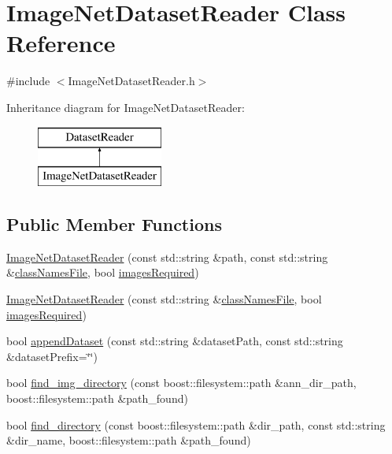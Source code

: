\hypertarget{class_image_net_dataset_reader}{}\section{Image\+Net\+Dataset\+Reader Class Reference}
\label{class_image_net_dataset_reader}


{\ttfamily \#include $<$Image\+Net\+Dataset\+Reader.\+h$>$}

Inheritance diagram for Image\+Net\+Dataset\+Reader\+:\begin{figure}[H]
\begin{center}
\leavevmode
\includegraphics[height=2.000000cm]{class_image_net_dataset_reader}
\end{center}
\end{figure}
\subsection*{Public Member Functions}
\begin{DoxyCompactItemize}
\item 
\hyperlink{class_image_net_dataset_reader_aca1e379e9959ec441fc9f3cf51ae5af1}{Image\+Net\+Dataset\+Reader} (const std\+::string \&path, const std\+::string \&\hyperlink{class_dataset_reader_a45ded43b56539f1e37a24ca9c94b4611}{class\+Names\+File}, bool \hyperlink{class_dataset_reader_a71d04d25d58e0e9a0c05d69afcff03a1}{images\+Required})
\item 
\hyperlink{class_image_net_dataset_reader_a451f7a4c7a11966e2539a0a51d7cd089}{Image\+Net\+Dataset\+Reader} (const std\+::string \&\hyperlink{class_dataset_reader_a45ded43b56539f1e37a24ca9c94b4611}{class\+Names\+File}, bool \hyperlink{class_dataset_reader_a71d04d25d58e0e9a0c05d69afcff03a1}{images\+Required})
\item 
bool \hyperlink{class_image_net_dataset_reader_ae9aa640c47637de8cf22ed3644c945c6}{append\+Dataset} (const std\+::string \&dataset\+Path, const std\+::string \&dataset\+Prefix=\char`\"{}\char`\"{})
\item 
bool \hyperlink{class_image_net_dataset_reader_ac9bbb0c47493ea984681d51be2e04b45}{find\+\_\+img\+\_\+directory} (const boost\+::filesystem\+::path \&ann\+\_\+dir\+\_\+path, boost\+::filesystem\+::path \&path\+\_\+found)
\item 
bool \hyperlink{class_image_net_dataset_reader_aaad29c493db0f08ad14a426aa900a000}{find\+\_\+directory} (const boost\+::filesystem\+::path \&dir\+\_\+path, const std\+::string \&dir\+\_\+name, boost\+::filesystem\+::path \&path\+\_\+found)
\end{DoxyCompactItemize}
